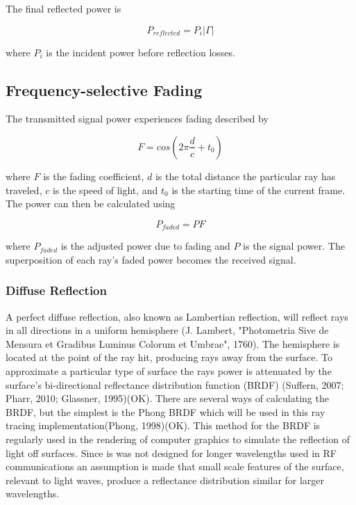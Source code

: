 The final reflected power is

\begin{equation}
	P_{reflected} = P_i|\Gamma|
	\label{eqn:reflected_power}
\end{equation}

where $P_i$ is the incident power before reflection losses.

\subsection{Frequency-selective Fading}
The transmitted signal power experiences fading described by

\begin{equation}
	F = cos\left(2\pi \frac{d}{c} + t_0\right)
	\label{eqn:fading_coeff}
\end{equation}

where $F$ is the fading coefficient, $d$ is the total distance the particular ray has traveled, $c$ is the speed of light, and $t_0$ is the starting time of the current frame. The power can then be calculated using

\begin{equation}
	P_{faded} = PF
	\label{eqn:power_faded}
\end{equation}

where $P_{faded}$ is the adjusted power due to fading and $P$ is the signal power. The superposition of each ray's faded power becomes the received signal.

\subsubsection{Diffuse Reflection}
A perfect diffuse reflection, also known as Lambertian reflection, will reflect rays in all directions in a uniform hemisphere (J. Lambert, "Photometria Sive de Mensura et Gradibus Luminus Colorum et Umbrae", 1760). The hemisphere is located at the point of the ray hit, producing rays away from the surface. To approximate a particular type of surface the rays power is attenuated by the surface's bi-directional reflectance distribution function (BRDF) (Suffern, 2007; Pharr, 2010; Glassner, 1995)(OK). There are several ways of calculating the BRDF, but the simplest is the Phong BRDF which will be used in this ray tracing implementation(Phong, 1998)(OK). This method for the BRDF is regularly used in the rendering of computer graphics to simulate the reflection of light off surfaces. Since is was not designed for longer wavelengths used in RF communications an assumption is made that small scale features of the surface, relevant to light waves,  produce a reflectance distribution similar for larger wavelengths. 


